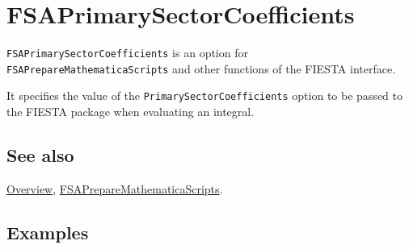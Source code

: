 \documentclass[../FeynHelpersManual.tex]{subfiles}
\begin{document}
\hypertarget{fsaprimarysectorcoefficients}{
\section{FSAPrimarySectorCoefficients}\label{fsaprimarysectorcoefficients}}

\texttt{FSAPrimarySectorCoefficients} is an option for
\texttt{FSAPrepareMathematicaScripts} and other functions of the FIESTA
interface.

It specifies the value of the \texttt{PrimarySectorCoefficients} option
to be passed to the FIESTA package when evaluating an integral.

\subsection{See also}

\hyperlink{toc}{Overview},
\hyperlink{fsapreparemathematicascripts}{FSAPrepareMathematicaScripts}.

\subsection{Examples}
\end{document}
